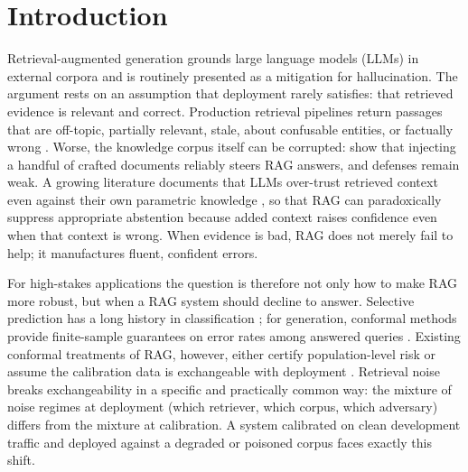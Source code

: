 \documentclass[sn-basic]{sn-jnl}
\theoremstyle{thmstyleone}
\theoremstyle{thmstyletwo}
\begin{document}

\maketitle

\section{Introduction}\label{sec:intro}

Retrieval-augmented generation \citep{lewis2020rag}
grounds large language models (LLMs) in external corpora and is
routinely presented as a mitigation for hallucination. The
argument rests on an assumption that deployment rarely satisfies:
that retrieved evidence is relevant and correct. Production retrieval
pipelines return passages that are off-topic, partially relevant,
stale, about confusable entities, or factually wrong
\citep{chen2023rgb,wang2024astuterag,cuconasu2024power}. Worse, the
knowledge corpus itself can be corrupted: \citet{zou2025poisonedrag}
show that injecting a handful of crafted documents reliably steers RAG
answers, and defenses remain weak. A growing literature documents that
LLMs over-trust retrieved context even against their own parametric
knowledge \citep{xie2024adaptive,kortukov2024conflicts,xu2024survey}, so that RAG
can paradoxically suppress appropriate abstention because added context
raises confidence even when that context is wrong.
When evidence is bad, RAG does not merely fail to help; it manufactures
fluent, confident errors.

For high-stakes applications the question is therefore not only how to
make RAG more robust, but when a RAG system should decline to answer.
Selective prediction has a long history in classification
\citep{chow1970,geifman2017selective}; for generation, conformal
methods provide finite-sample guarantees on error rates among answered
queries \citep{angelopoulos2024crc,abbasi2024conformalabstention,
quach2024conformal,mohri2024factuality}. Existing conformal treatments
of RAG, however, either certify population-level risk
\citep{kang2024crag} or assume the calibration data is exchangeable
with deployment \citep{li2024traq,feng2025conformalrag}. Retrieval
noise breaks exchangeability in a specific and practically common way:
the mixture of noise regimes at deployment (which retriever, which
corpus, which adversary) differs from the mixture at calibration. A
system calibrated on clean development traffic and deployed against a
degraded or poisoned corpus faces exactly this shift.
\end{document}
